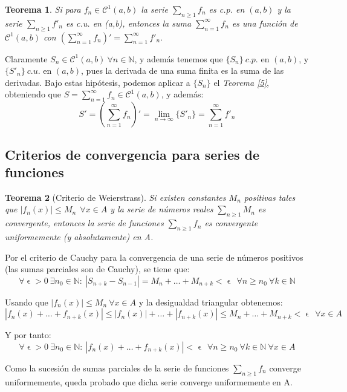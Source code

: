 \documentclass[11pt, a4paper]{article}
\makeatletter
\newif\IfInSansMode
\let\oldsf\sffamily
\renewcommand*{\sffamily}{\oldsf\mathversion{sans}\InSansModetrue}
\let\oldnorm\normalfont
\renewcommand*{\normalfont}{\oldnorm\InSansModefalse\mathversion{normal}}
\let\epsilon\upvarepsilon
\renewenvironment{proof}[1][\proofname] {\par\pushQED{\qed}\normalfont\topsep6\p@\@plus6\p@\relax\trivlist\item[\hskip\labelsep\itshape\sffamily#1\@addpunct{.}]\ignorespaces}{\popQED\endtrivlist\@endpefalse}
\theoremstyle{theorem-style}
\newtheorem{nth}{Teorema}[section]
\theoremstyle{definition-style}
\theoremstyle{remark-style}
\theoremstyle{example-style}
\makeatother
\begin{document}
\begin{nth} \label{9}
  Si para $f_n\in \mathcal{C}^1(a,b)$  la serie  $\sum_{n\geq 1} f_n $ es  c.p.  en $(a,b)$ y  la serie  $ \sum_{n\geq 1} f'_n $ es  c.u. en (a,b), entonces la suma $\displaystyle \sum_{n=1}^{\infty} f_n $ es una funci\'on de  $\mathcal{C}^1(a,b)$ con 
  $
  \displaystyle \left( \sum_{n=1}^{\infty} f_n \right)' =  \sum_{n=1}^{\infty}  f'_n  .
  $
\end{nth}


  \begin{proof}
    Claramente $S_n \in \mathcal{C}^1(a,b)\ \forall n \in \mathbb{N}$, y además tenemos que $\{S_n\}\ c.p.$ en $(a,b)$, y $\{S'_n\}\ c.u.$ en $(a,b)$, pues la derivada de una suma finita es la suma de las derivadas. Bajo estas hipótesis, podemos aplicar a $\{S_n\}$ el \textit{Teorema \ref{5}}, obteniendo que $S = \sum_{n=1}^{\infty} f_n \in \mathcal{C}^1(a,b)$, y además:
    $$S' = \left( \sum_{n=1}^{\infty} f_n \right)' = \lim_{n \to \infty} \{S'_n\} = \sum_{n=1}^{\infty} f'_n$$
  \end{proof}

\subsection{Criterios de convergencia para series de funciones}

\begin{nth}[Criterio de Weierstrass] \label{10}
  Si existen constantes $ M_{n} $ positivas tales que $ |f_{n}(x)| \leq M_{n}\ \ \forall x \in A$ y la serie de números reales $ \sum_{n \ge 1}M_{n} $ es convergente, entonces la serie de funciones $ \sum_{n \ge 1}f_{n} $ es convergente uniformemente (y absolutamente) en A.  
\end{nth}

\begin{proof}
    Por el criterio de Cauchy para la convergencia de una serie de números positivos (las sumas parciales son de Cauchy), se tiene que:
    $$ \forall \epsilon > 0\ \exists n_{0} \in \mathbb{N}:\ |S_{n+k} - S_{n-1}| = M_{n} + \dots + M_{n+k} < \epsilon\ \  \forall n \geq n_{0}\ \forall k \in \mathbb{N} $$
    
    Usando que $ |f_{n}(x)| \leq M_{n}\ \forall x \in A $ y la desigualdad triangular obtenemos:
    $$ |f_{n}(x) + \dots + f_{n+k}(x)| \leq |f_{n}(x)| + \dots + |f_{n+k}(x)| \leq M_{n} + \dots + M_{n+k} < \epsilon\ \ \forall x \in A $$
    
    Y por tanto:
    $$\forall \epsilon > 0\ \exists n_{0} \in \mathbb{N}:\ |f_{n}(x) + \dots + f_{n+k}(x)| < \epsilon\ \  \forall n \geq n_{0}\ \forall k \in \mathbb{N}\ \forall x \in A $$
    
    Como la sucesión de sumas parciales de la serie de funciones $\sum_{n\ge 1} f_n$ converge uniformemente, queda probado que dicha serie converge uniformemente en A.
  \end{proof}
\end{document}
